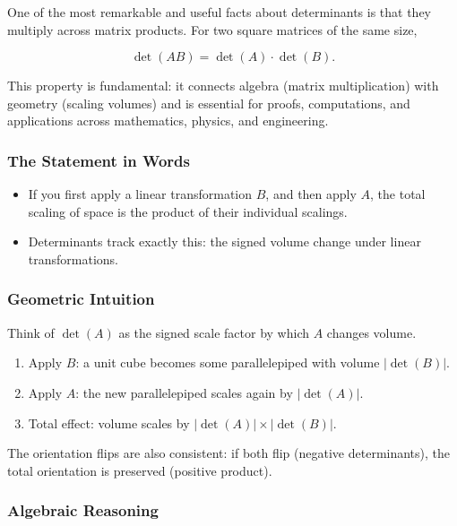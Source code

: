 \documentclass[
  letterpaper,
  DIV=11,
  numbers=noendperiod]{scrreprt}
\providecommand{\tightlist}{%
  \setlength{\itemsep}{0pt}\setlength{\parskip}{0pt}}
\begin{document}
One of the most remarkable and useful facts about determinants is that
they multiply across matrix products. For two square matrices of the
same size,

\[
\det(AB) = \det(A) \cdot \det(B).
\]

This property is fundamental: it connects algebra (matrix
multiplication) with geometry (scaling volumes) and is essential for
proofs, computations, and applications across mathematics, physics, and
engineering.

\subsubsection{The Statement in Words}\label{the-statement-in-words}

\begin{itemize}
\tightlist
\item
  If you first apply a linear transformation \(B\), and then apply
  \(A\), the total scaling of space is the product of their individual
  scalings.
\item
  Determinants track exactly this: the signed volume change under linear
  transformations.
\end{itemize}

\subsubsection{Geometric Intuition}\label{geometric-intuition-4}

Think of \(\det(A)\) as the signed scale factor by which \(A\) changes
volume.

\begin{enumerate}
\def\labelenumi{\arabic{enumi}.}
\tightlist
\item
  Apply \(B\): a unit cube becomes some parallelepiped with volume
  \(|\det(B)|\).
\item
  Apply \(A\): the new parallelepiped scales again by \(|\det(A)|\).
\item
  Total effect: volume scales by \(|\det(A)| \times |\det(B)|\).
\end{enumerate}

The orientation flips are also consistent: if both flip (negative
determinants), the total orientation is preserved (positive product).

\subsubsection{Algebraic Reasoning}\label{algebraic-reasoning}
\end{document}
